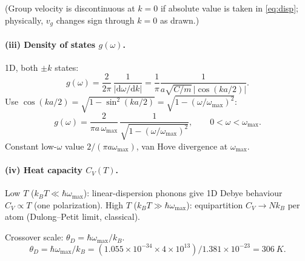 \documentclass[11pt]{article}
\newcommand{\de}{\mathrm{d}}
\begin{document}
(Group velocity is discontinuous at $k=0$ if absolute value is taken in \eqref{eq:disp}; physically, $v_g$ changes sign through $k=0$ as drawn.)

\paragraph{(iii) Density of states $g(\omega)$.}

1D, both $\pm k$ states:
\[
g(\omega) = \frac{2}{2\pi}\,\frac{1}{|\de\omega/\de k|} = \frac{1}{\pi}\frac{1}{a\sqrt{C/m}\,|\!\cos(ka/2)|}.
\]
Use $\cos(ka/2) = \sqrt{1-\sin^2(ka/2)} = \sqrt{1 - (\omega/\omega_\text{max})^2}$:
\[
\boxed{\;g(\omega) = \frac{2}{\pi a\,\omega_\text{max}}\,\frac{1}{\sqrt{1-(\omega/\omega_\text{max})^2}},\qquad 0<\omega<\omega_\text{max}.\;}
\]
Constant low-$\omega$ value $2/(\pi a\omega_\text{max})$, van Hove divergence at $\omega_\text{max}$.

\begin{center}
\end{center}

\paragraph{(iv) Heat capacity $C_V(T)$.}

Low $T$ ($k_B T\ll \hbar\omega_\text{max}$): linear-dispersion phonons give 1D Debye behaviour $C_V\propto T$ (one polarization). High $T$ ($k_B T\gg \hbar\omega_\text{max}$): equipartition $C_V \to N k_B$ per atom (Dulong--Petit limit, classical).

Crossover scale: $\theta_D = \hbar\omega_\text{max}/k_B$.
\[
\theta_D = \hbar\omega_\text{max}/k_B = (1.055\times 10^{-34}\times 4\times 10^{13})/1.381\times 10^{-23} = \SI{306}{K}.
\]

\begin{center}
\end{center}
\end{document}
